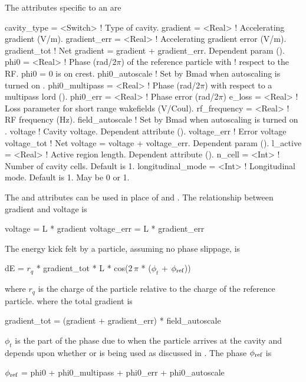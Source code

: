 The attributes specific to an  are 
\begin{example}
  cavity_type     = <Switch>  ! Type of cavity.
  gradient        = <Real>    ! Accelerating gradient (V/m).
  gradient_err    = <Real>    ! Accelerating gradient error (V/m).
  gradient_tot                ! Net gradient = gradient + gradient_err. Dependent param ().
  phi0            = <Real>    ! Phase (rad/2\(\pi\)) of the reference particle with 
                              !   respect to the RF. phi0 = 0 is on crest.
  phi0_autoscale              ! Set by Bmad when autoscaling is turned on .
  phi0_multipass  = <Real>    ! Phase (rad/2\(\pi\)) with respect to a multipass lord ().
  phi0_err        = <Real>    ! Phase error (rad/2\(\pi\))
  e_loss          = <Real>    ! Loss parameter for short range wakefields (V/Coul).
  rf_frequency    = <Real>    ! RF frequency (Hz).
  field_autoscale             ! Set by Bmad when autoscaling is turned on .
  voltage                     ! Cavity voltage. Dependent attribute ().
  voltage_err                 ! Error voltage
  voltage_tot                 ! Net voltage = voltage + voltage_err. Dependent param ().
  l_active        = <Real>    ! Active region length. Dependent attribute ().
  n_cell          = <Int>     ! Number of cavity cells. Default is 1.
  longitudinal_mode = <Int>   ! Longitudinal mode. Default is 1. May be 0 or 1.
\end{example}

The  and  attributes can be used in place of  and .
The relationship between gradient and voltage is
\begin{example}
  voltage     = L * gradient
  voltage_err = L * gradient_err
\end{example}

The energy kick felt by a particle, assuming no phase slippage, is 
\begin{example}
  dE = \(r_q\) * gradient_tot * L * cos(\(2\,\pi\) * (\(\phi_t\) + \(\phi_{\text{ref}}\)))
\end{example}
where $r_q$ is the charge of the particle relative to the charge of the reference particle.
where the total gradient is
\begin{example}
  gradient_tot = (gradient + gradient_err) * field_autoscale
\end{example}
$\phi_t$ is the part of the phase due to when the particle arrives at the cavity and depends upon
whether  or  is being used as discussed in
. The phase $\phi_{\text{ref}}$ is
\begin{example}
  \(\phi_{\text{ref}}\) = phi0 + phi0_multipass + phi0_err + phi0_autoscale
  \label{lcav.phi}
\end{example}

